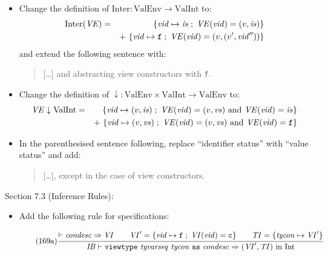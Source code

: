 \documentclass[twoside,titlepage]{article}
\begin{document}
\begin{appendix}
\begin{itemize}
\item Change the definition of $\mbox{Inter} : \mbox{ValEnv} \to \mbox{ValInt}$ to:
  \begin{eqnarray*}
  \mbox{Inter}(\mathit{VE}) &=& \{\mathit{vid}\mapsto\mathit{is} \;;\; \mathit{VE}(\mathit{vid}) = (v,\mathit{is})\} \\
  &&+~\{\mathit{vid}\mapsto{\tt{f}} \;;\; \mathit{VE}(\mathit{vid}) = (v,(v',\mathit{vid}''))\}
  \end{eqnarray*}
  and extend the following sentence with:
  \begin{quote}
  [\dots] and abstracting view constructors with {\tt f}.
  \end{quote}

\item Change the definition of $\downarrow : \mbox{ValEnv} \times \mbox{ValInt} \to \mbox{ValEnv}$ to:
  \begin{eqnarray*}
  \mathit{VE}\downarrow\mbox{ValInt} &=& \{\mathit{vid}\mapsto(v,\mathit{is}) \;;\; \mathit{VE}(\mathit{vid}) = (v,\mathit{vs})~\mbox{and}~\mathit{VE}(\mathit{vid}) = \mathit{is}\} \\
  &&+~\{\mathit{vid}\mapsto(v,\mathit{vs}) \;;\; \mathit{VE}(\mathit{vid}) = (v,\mathit{vs})~\mbox{and}~\mathit{VE}(\mathit{vid}) = {\tt{f}}\}
  \end{eqnarray*}

\item In the parenthesised sentence following, replace ``identifier status'' with ``value status'' and add:
  \begin{quote}
  [\dots], except in the case of view constructors.
  \end{quote}
\end{itemize}

Section 7.3 (Inference Rules):
\begin{itemize}
\item Add the following rule for specifications:

  \begin{equation}
  \tag{169a}
  \frac{
  \begin{array}{@{}c@{}}
  \vdash \mathit{condesc} \Rightarrow \mathit{VI}
  \qquad
  \mathit{VI}' = \{\mathit{vid}\mapsto{\tt{f}}\;;\;\mathit{VI}(\mathit{vid}) = {\tt c}\}
  \qquad
  \mathit{TI} = \{\mathit{tycon}\mapsto\mathit{VI}'\}
  \end{array}
  }{
  \begin{array}{@{}l@{}}
  \mathit{IB} \vdash {\tt viewtype}~\mathit{tyvarseq}~\mathit{tycon}~{\tt as}~\mathit{condesc} \Rightarrow \mbox{$(\mathit{VI}',\mathit{TI})$ in Int}
  \end{array}
  }
  \end{equation}


\end{itemize}
\end{appendix}
\end{document}
